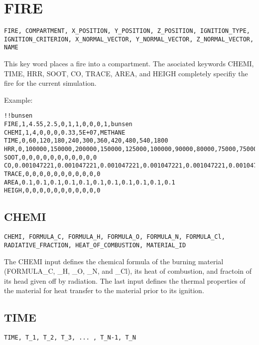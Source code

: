 \section{FIRE}

\begin{lstlisting}
FIRE, COMPARTMENT, X_POSITION, Y_POSITION, Z_POSITION, IGNITION_TYPE, IGNITION_CRITERION, X_NORMAL_VECTOR, Y_NORMAL_VECTOR, Z_NORMAL_VECTOR, NAME
\end{lstlisting}

This key word places a fire  into a compartment. The asociated keywords CHEMI, TIME, HRR, SOOT, CO, TRACE, AREA, and HEIGH completely specifiy the fire for the current simulation.

Example:

\begin{lstlisting}
!!bunsen
FIRE,1,4.55,2.5,0,1,1,0,0,0,1,bunsen
CHEMI,1,4,0,0,0,0.33,5E+07,METHANE
TIME,0,60,120,180,240,300,360,420,480,540,1800
HRR,0,100000,150000,200000,150000,125000,100000,90000,80000,75000,75000
SOOT,0,0,0,0,0,0,0,0,0,0,0
CO,0.001047221,0.001047221,0.001047221,0.001047221,0.001047221,0.001047221,0.001047221,0.001047221,0.001047221,0.001047221,0.001047221
TRACE,0,0,0,0,0,0,0,0,0,0,0
AREA,0.1,0.1,0.1,0.1,0.1,0.1,0.1,0.1,0.1,0.1,0.1
HEIGH,0,0,0,0,0,0,0,0,0,0,0
\end{lstlisting}

\subsection{CHEMI}

\begin{lstlisting}
CHEMI, FORMULA_C, FORMULA_H, FORMULA_O, FORMULA_N, FORMULA_Cl,  RADIATIVE_FRACTION, HEAT_OF_COMBUSTION, MATERIAL_ID
\end{lstlisting}

The CHEMI input defines the chemical formula of the burning material (FORMULA\_C, \_H, \_O, \_N, and \_Cl), its heat of combustion, and fractoin of its head given off by radiation. The last input defines the thermal properties of the material for heat transfer to the material prior to its ignition.

\subsection{TIME}

\begin{lstlisting}
TIME, T_1, T_2, T_3, ... , T_N-1, T_N
\end{lstlisting}

